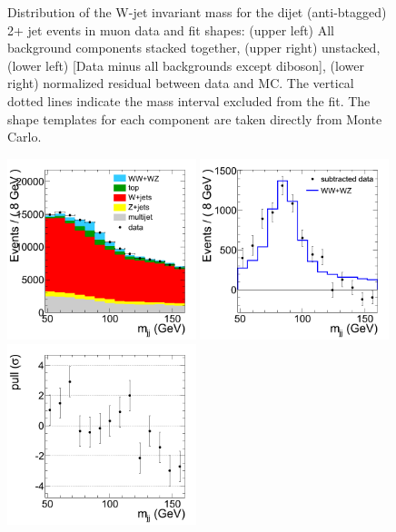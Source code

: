 \begin{figure}[h!]
{    \caption{Distribution of the W-jet invariant mass for the dijet (anti-btagged) 2+ jet events in muon data and fit shapes: 
      (upper left) All background components stacked together, 
      (upper right) unstacked, (lower left) [Data minus all backgrounds except diboson],  
      (lower right) normalized residual between data and MC. The vertical dotted lines
      indicate the mass interval excluded from the fit. The shape templates for each component are taken directly from Monte Carlo.}
    \label{fig:mjjfit_MCTemplate_mu}}
\end{figure}
\begin{figure}[h!]
  {\centering
    \includegraphics[width=0.49\textwidth]{figs/mjjfit/DibosonMCTemplatelnujj_electron_Stacked.png}
    \includegraphics[width=0.49\textwidth]{figs/mjjfit/DibosonMCTemplatelnujj_electron_Subtracted.png}
    \includegraphics[width=0.49\textwidth]{figs/mjjfit/DibosonMCTemplatelnujj_electron_Pull.png}
}
\end{figure}
